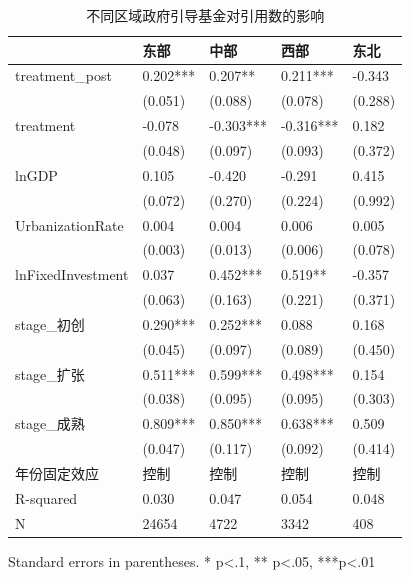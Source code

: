 \begin{table}
\caption{不同区域政府引导基金对引用数的影响}
\label{}
\begin{center}
\begin{tabular}{lllll}
\hline
                  & 东部       & 中部        & 西部        & 东北       \\
\hline
treatment\_post   & 0.202*** & 0.207**   & 0.211***  & -0.343   \\
                  & (0.051)  & (0.088)   & (0.078)   & (0.288)  \\
treatment         & -0.078   & -0.303*** & -0.316*** & 0.182    \\
                  & (0.048)  & (0.097)   & (0.093)   & (0.372)  \\
lnGDP             & 0.105    & -0.420    & -0.291    & 0.415    \\
                  & (0.072)  & (0.270)   & (0.224)   & (0.992)  \\
UrbanizationRate              & 0.004    & 0.004     & 0.006     & 0.005    \\
                  & (0.003)  & (0.013)   & (0.006)   & (0.078)  \\
lnFixedInvestment & 0.037    & 0.452***  & 0.519**   & -0.357   \\
                  & (0.063)  & (0.163)   & (0.221)   & (0.371)  \\
stage\_初创         & 0.290*** & 0.252***  & 0.088     & 0.168    \\
                  & (0.045)  & (0.097)   & (0.089)   & (0.450)  \\
stage\_扩张         & 0.511*** & 0.599***  & 0.498***  & 0.154    \\
                  & (0.038)  & (0.095)   & (0.095)   & (0.303)  \\
stage\_成熟         & 0.809*** & 0.850***  & 0.638***  & 0.509    \\
                  & (0.047)  & (0.117)   & (0.092)   & (0.414)  \\
年份固定效应  & 控制 & 控制 & 控制 & 控制\\ 
\hline

R-squared         & 0.030    & 0.047     & 0.054     & 0.048    \\
N                 & 24654    & 4722      & 3342      & 408      \\
\hline
\end{tabular}
\end{center}
\end{table}
\bigskip
Standard errors in parentheses. \newline 
* p<.1, ** p<.05, ***p<.01

